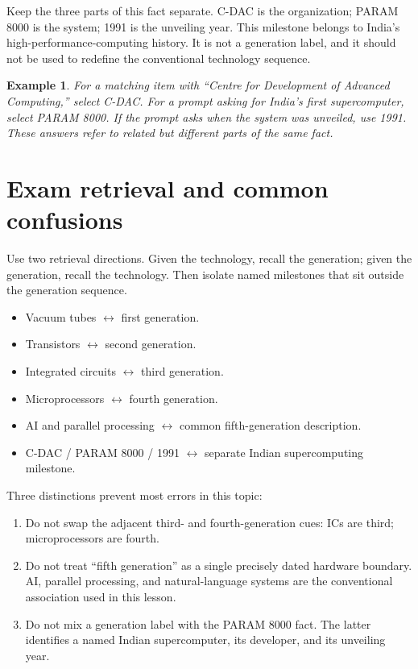 \documentclass[11pt]{article}
\newtheorem{example}{Example}[section]
\begin{document}
Keep the three parts of this fact separate. C-DAC is the organization;
PARAM 8000 is the system; 1991 is the unveiling year. This milestone
belongs to India's high-performance-computing history. It is not a
generation label, and it should not be used to redefine the conventional
technology sequence.

\begin{example}
For a matching item with ``Centre for Development of Advanced Computing,''
select C-DAC. For a prompt asking for India's first supercomputer, select
PARAM 8000. If the prompt asks when the system was unveiled, use 1991.
These answers refer to related but different parts of the same fact.
\end{example}

\section{Exam retrieval and common confusions}
Use two retrieval directions. Given the technology, recall the generation;
given the generation, recall the technology. Then isolate named milestones
that sit outside the generation sequence.
\begin{itemize}
  \item Vacuum tubes $\leftrightarrow$ first generation.
  \item Transistors $\leftrightarrow$ second generation.
  \item Integrated circuits $\leftrightarrow$ third generation.
  \item Microprocessors $\leftrightarrow$ fourth generation.
  \item AI and parallel processing $\leftrightarrow$ common fifth-generation
    description.
  \item C-DAC / PARAM 8000 / 1991 $\leftrightarrow$ separate Indian
    supercomputing milestone.
\end{itemize}

Three distinctions prevent most errors in this topic:
\begin{enumerate}
  \item Do not swap the adjacent third- and fourth-generation cues: ICs are
    third; microprocessors are fourth.
  \item Do not treat ``fifth generation'' as a single precisely dated
    hardware boundary. AI, parallel processing, and natural-language
    systems are the conventional association used in this lesson.
  \item Do not mix a generation label with the PARAM 8000 fact. The latter
    identifies a named Indian supercomputer, its developer, and its
    unveiling year.
\end{enumerate}
\end{document}
